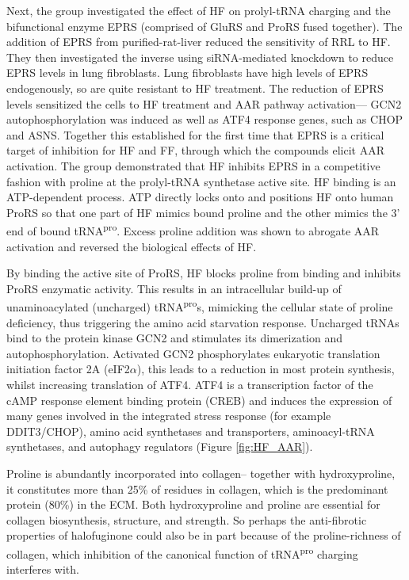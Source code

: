 Next, the group investigated the effect of HF on prolyl-tRNA charging and the bifunctional enzyme EPRS (comprised of GluRS and ProRS fused together).
The addition of EPRS from purified-rat-liver reduced the sensitivity of RRL to HF.
They then investigated the inverse using siRNA-mediated knockdown to reduce EPRS levels in lung fibroblasts.
Lung fibroblasts have high levels of EPRS endogenously, so are quite resistant to HF treatment.
The reduction of EPRS levels sensitized the cells to HF treatment and AAR pathway activation--- GCN2 autophosphorylation was induced as well as ATF4 response genes, such as CHOP and ASNS\@.
Together this established for the first time that EPRS is a critical target of inhibition for HF and FF, through which the compounds elicit AAR activation.
The group demonstrated that HF inhibits EPRS in a competitive fashion with proline at the prolyl-tRNA synthetase active site.
HF binding is an ATP-dependent process.
ATP directly locks onto and positions HF onto human ProRS so that one part of HF mimics bound proline and the other mimics the 3' end of bound tRNA\textsuperscript{pro}\cite{zhou2013atp}.
Excess proline addition was shown to abrogate AAR activation and reversed the biological effects of HF\cite{keller2012halofuginone}.

By binding the active site of ProRS, HF blocks proline from binding and inhibits ProRS enzymatic activity.
This results in an intracellular build-up of unaminoacylated (uncharged) tRNA\textsuperscript{pro}s, mimicking the cellular state of proline deficiency, thus triggering the amino acid starvation response.
Uncharged tRNAs bind to the protein kinase GCN2 and stimulates its dimerization and autophosphorylation.
Activated GCN2 phosphorylates eukaryotic translation initiation factor 2A (eIF2$\alpha$), this leads to a reduction in most protein synthesis, whilst increasing translation of ATF4.
ATF4 is a transcription factor of the cAMP response element binding protein (CREB) and induces the expression of many genes involved in the integrated stress response (for example DDIT3/CHOP), amino acid synthetases and transporters, aminoacyl-tRNA synthetases, and autophagy regulators (Figure \ref{fig:HF_AAR})\cite{ye2015gcn2, sundrud2009halofuginone}.

Proline is abundantly incorporated into collagen-- together with hydroxyproline, it constitutes more than 25\% of residues in collagen, which is the predominant protein (80\%) in the ECM\cite{liu2013mirna}\@.
Both hydroxyproline and proline are essential for collagen biosynthesis, structure, and strength\cite{albaugh2017proline}.
So perhaps the anti-fibrotic properties of halofuginone could also be in part because of the proline-richness of collagen, which inhibition of the canonical function of tRNA\textsuperscript{pro} charging interferes with.

